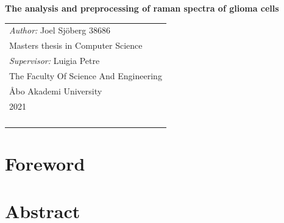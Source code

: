 \documentclass[a4paper, 12pt, oneside]{book}
\begin{document}
\pagestyle{empty}    
\begingroup
{}


\begin{titlepage}
\vspace*{144pt}
\begin{center}
\Huge\bf The analysis and preprocessing of raman spectra of glioma cells %


\end{center}
\enlargethispage{3cm}
\vfill

\hfill
\begin{tabular}[t]{l@{}}%
\textit{Author:} Joel Sjöberg 38686\\ %
Masters thesis in Computer Science\\ %
\textit{Supervisor:} Luigia Petre\\ %
The Faculty Of Science And Engineering\\ %
Åbo Akademi University\\ 
2021\\ %
\\
\\
\\
\\
\end{tabular}
\end{titlepage}


\tableofcontents 


\endgroup %

\clearpage
\pagestyle{plain}      
\chapter*{Foreword}


\chapter*{Abstract}


%
\end{document}
